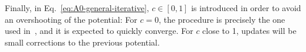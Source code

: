 Finally, in Eq.~\eqref{eq:A0-general-iterative}, $c\in [0, 1]$ is introduced in order to avoid an overshooting of the potential: For
$c=0$, the procedure is precisely the one used in~\cite[]{ambjorn_properties_1983}, and it is expected to quickly converge. For
$c$ close to 1, updates will be small corrections to the previous potential.




